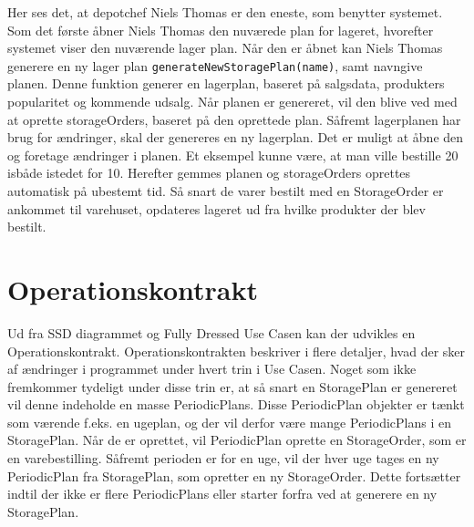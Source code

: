 Her ses det, at depotchef Niels Thomas er den eneste, som benytter systemet. Som det første åbner Niels Thomas den nuværede plan for lageret, hvorefter systemet viser den nuværende lager plan. Når den er åbnet kan Niels Thomas generere en ny lager plan 
\verb|generateNewStoragePlan(name)|, samt navngive planen. Denne funktion generer en lagerplan, baseret på salgsdata, produkters popularitet og kommende udsalg. Når planen er genereret, vil den blive ved med at oprette storageOrders, baseret på den oprettede plan. 
Såfremt lagerplanen har brug for ændringer, skal der genereres en ny lagerplan. Det er muligt at åbne den og foretage ændringer i planen. Et eksempel kunne være, at man ville bestille 20 isbåde istedet for 10. Herefter gemmes planen og storageOrders oprettes automatisk på ubestemt tid. 
Så snart de varer bestilt med en StorageOrder er ankommet til varehuset, opdateres lageret ud fra hvilke produkter der blev bestilt.

\section{Operationskontrakt}
Ud fra SSD diagrammet og Fully Dressed Use Casen kan der udvikles en Operationskontrakt\cite{Larman2004}. Operationskontrakten beskriver i flere detaljer, hvad der sker af ændringer i programmet under hvert trin i Use Casen. Noget som ikke fremkommer tydeligt under disse trin er, at så snart en StoragePlan er genereret vil denne indeholde en masse PeriodicPlans. Disse PeriodicPlan objekter er tænkt som værende f.eks. en ugeplan, og der vil derfor være mange PeriodicPlans i en StoragePlan. Når de er oprettet, vil PeriodicPlan oprette en StorageOrder, som er en varebestilling. Såfremt perioden er for en uge, vil der hver uge tages en ny PeriodicPlan fra StoragePlan, som opretter en ny StorageOrder. Dette fortsætter indtil der ikke er flere PeriodicPlans eller starter forfra ved at generere en ny StoragePlan.


